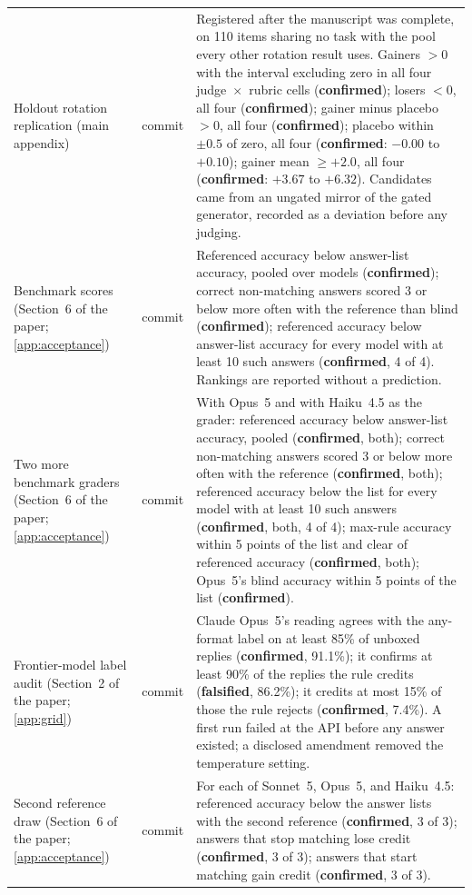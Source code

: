 {\begin{longtable}{L{3.2cm}L{1.1cm}L{8.7cm}}
Holdout rotation replication (main appendix) & commit & Registered after the manuscript was complete, on 110 items sharing no task with the pool every other rotation result uses. Gainers $>0$ with the interval excluding zero in all four judge~$\times$~rubric cells (\textbf{confirmed}); losers $<0$, all four (\textbf{confirmed}); gainer minus placebo $>0$, all four (\textbf{confirmed}); placebo within $\pm0.5$ of zero, all four (\textbf{confirmed}: $-0.00$ to $+0.10$); gainer mean $\ge +2.0$, all four (\textbf{confirmed}: $+3.67$ to $+6.32$). Candidates came from an ungated mirror of the gated generator, recorded as a deviation before any judging. \\Benchmark scores (Section~6 of the paper; \cref{app:acceptance}) & commit & Referenced accuracy below answer-list accuracy, pooled over models (\textbf{confirmed}); correct non-matching answers scored 3 or below more often with the reference than blind (\textbf{confirmed}); referenced accuracy below answer-list accuracy for every model with at least 10 such answers (\textbf{confirmed}, 4 of 4). Rankings are reported without a prediction. \\
Two more benchmark graders (Section~6 of the paper; \cref{app:acceptance}) & commit & With Opus~5 and with Haiku~4.5 as the grader: referenced accuracy below answer-list accuracy, pooled (\textbf{confirmed}, both); correct non-matching answers scored 3 or below more often with the reference (\textbf{confirmed}, both); referenced accuracy below the list for every model with at least 10 such answers (\textbf{confirmed}, both, 4 of 4); max-rule accuracy within 5 points of the list and clear of referenced accuracy (\textbf{confirmed}, both); Opus~5's blind accuracy within 5 points of the list (\textbf{confirmed}). \\
Frontier-model label audit (Section~2 of the paper; \cref{app:grid}) & commit & Claude Opus~5's reading agrees with the any-format label on at least 85\% of unboxed replies (\textbf{confirmed}, 91.1\%); it confirms at least 90\% of the replies the rule credits (\textbf{falsified}, 86.2\%); it credits at most 15\% of those the rule rejects (\textbf{confirmed}, 7.4\%). A first run failed at the API before any answer existed; a disclosed amendment removed the temperature setting. \\
Second reference draw (Section~6 of the paper; \cref{app:acceptance}) & commit & For each of Sonnet~5, Opus~5, and Haiku~4.5: referenced accuracy below the answer lists with the second reference (\textbf{confirmed}, 3 of 3); answers that stop matching lose credit (\textbf{confirmed}, 3 of 3); answers that start matching gain credit (\textbf{confirmed}, 3 of 3). \\

\end{longtable}}
